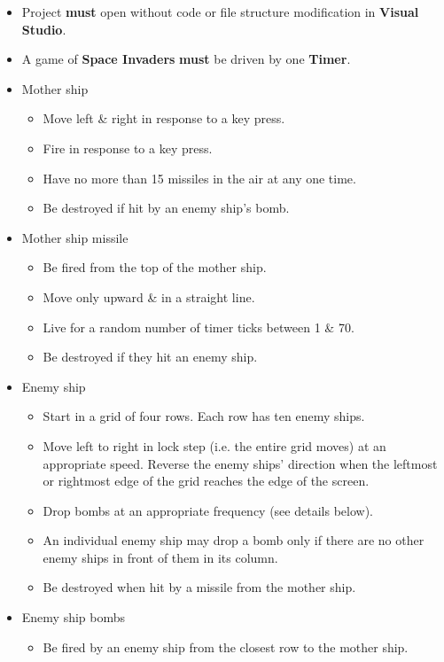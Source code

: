 \documentclass{article}
\begin{document}
\begin{itemize}
    \item Project \textbf{must} open without code or file structure modification in \textbf{Visual Studio}.
    \item A game of \textbf{Space Invaders} \textbf{must} be driven by one \textbf{Timer}.
    \item Mother ship
    \begin{itemize}
        \item Move left \& right in response to a key press.
        \item Fire in response to a key press.
        \item Have no more than 15 missiles in the air at any one time.
        \item Be destroyed if hit by an enemy ship's bomb.
    \end{itemize}
    \item Mother ship missile
    \begin{itemize}
        \item Be fired from the top of the mother ship.
        \item Move only upward \& in a straight line.
        \item Live for a random number of timer ticks between 1 \& 70.
        \item Be destroyed if they hit an enemy ship.
    \end{itemize}
    \item Enemy ship
    \begin{itemize}
        \item Start in a grid of four rows. Each row has ten enemy ships.
        \item Move left to right in lock step (i.e. the entire grid moves) at an appropriate speed. Reverse the enemy ships' direction when the leftmost or rightmost edge of the grid reaches the edge of the screen.
        \item Drop bombs at an appropriate frequency (see details below).
        \item An individual enemy ship may drop a bomb only if there are no other enemy ships in front of them in its column.
        \item Be destroyed when hit by a missile from the mother ship.
    \end{itemize}
    \item Enemy ship bombs
    \begin{itemize}
        \item Be fired by an enemy ship from the closest row to the mother ship. 

\end{itemize}
\end{itemize}
\end{document}
